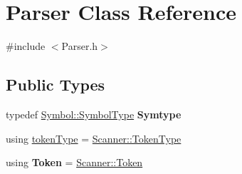 \hypertarget{class_parser}{}\section{Parser Class Reference}
\label{class_parser}


{\ttfamily \#include $<$Parser.\+h$>$}

\subsection*{Public Types}
\begin{DoxyCompactItemize}
\item 
\hypertarget{class_parser_a25ba9b450cd119541e982cb7c0d64d18}{}\label{class_parser_a25ba9b450cd119541e982cb7c0d64d18} 
typedef \hyperlink{class_symbol_a7ee37d4cfcb980f4eddf7ed1a028da5a}{Symbol\+::\+Symbol\+Type} {\bfseries Symtype}
\item 
using \hyperlink{class_parser_afff32ed1fe75105bdb39638ab79fbf32}{token\+Type} = \hyperlink{class_scanner_a1d588ca5cfd26bdff0e59b437da5b166}{Scanner\+::\+Token\+Type}
\item 
\hypertarget{class_parser_a965c06d2f316b898553d795e8baab9d0}{}\label{class_parser_a965c06d2f316b898553d795e8baab9d0} 
using {\bfseries Token} = \hyperlink{struct_scanner_1_1_token}{Scanner\+::\+Token}
\end{DoxyCompactItemize}
